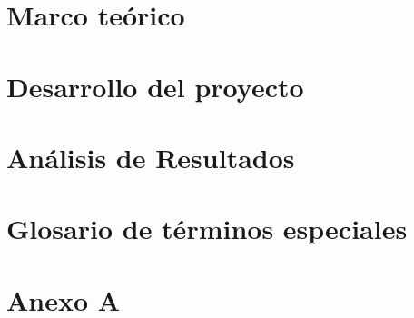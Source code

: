 \documentclass[letterpaper,10pt,graphicx,caption,rotating,oneside]{book}
\begin{document}
\chapter{Marco te\'{o}rico} 

\cite{Morgan}

\chapter{Desarrollo del proyecto}



\chapter{An\'{a}lisis de Resultados}









\newpage

\chapter*{Glosario de t\'{e}rminos especiales} 		

\chapter*{Anexo A} 					


\printindex                 				%
\end{document}

